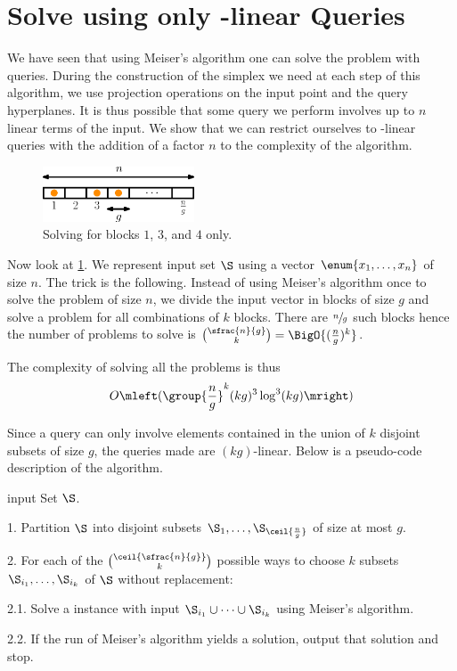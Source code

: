 \section{Solve \kSUM using only -linear Queries}

We have seen that using Meiser's algorithm one can solve the \kSUM problem
with  queries. During the construction of the simplex we
need at each step of this algorithm, we use projection operations on
the input point and the query hyperplanes. It is thus possible that some query we perform
involves up to \(n\) linear terms of the input.
We show that we can restrict ourselves to
-linear queries with the addition of a factor \(n\) to the complexity
of the algorithm.

\begin{figure}
\centering
\includegraphics[width=0.4\textwidth]{fig/point-location/blocks}
\caption{Solving \kSUM for blocks \(1\), \(3\), and \(4\) only.}
\label{fig:point-location:on:blocks}
\end{figure}

Now look at \ref{fig:point-location:on:blocks}. We represent input set \(\S\)
using a vector \(\enum{x_1,\ldots,x_n}\) of size \(n\). The trick is the
following. Instead of using Meiser's algorithm once to solve the problem of
size \(n\), we divide the input vector in blocks of size \(g\) and solve a
\kSUM problem for all combinations of \(k\) blocks. There are \(\sfrac{n}{g}\)
such blocks hence the number of problems to solve is \(\binom{\sfrac{n}{g}}{k}
= \BigO{(\frac{n}{g})^k} \).

The complexity of solving all the problems is thus
\begin{displaymath}
O\mleft(\group{\frac{n}{g}}^k (kg)^3 \log^3 (kg)\mright)
\end{displaymath}

Since a query can only involve elements contained in the union of \(k\)
disjoint subsets of size \(g\), the queries made are \((kg)\)-linear. Below is
a pseudo-code description of the algorithm.
\begin{algorithm}
\item[input] Set \(\S\).
\item[1.] Partition \(\S\) into disjoint subsets
\(\S_1,\ldots,\S_{\ceil{\frac{n}{g}}}\) of size at most \(g\).
\item[2.] For each of the \(\binom{\ceil{\sfrac{n}{g}}}{k}\) possible ways to
choose \(k\) subsets \(\S_{i_1},\ldots,\S_{i_k}\) of \(\S\) without
replacement:
\item[2.1.] Solve a \kSUM instance with input \(\S_{i_1} \cup \cdots \cup
\S_{i_k}\) using Meiser's algorithm.
\item[2.2.] If the run of Meiser's algorithm yields a solution, output that
solution and stop.
\end{algorithm}

